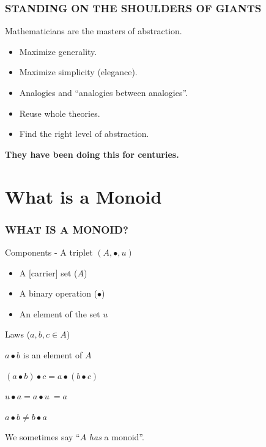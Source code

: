 \documentclass{beamer}
\begin{document}
\begin{frame} \frametitle{STANDING ON THE SHOULDERS OF GIANTS}
  Mathematicians are the \alert{masters of abstraction.}
  \begin{itemize}
  \item Maximize generality.
  \item Maximize simplicity (elegance).
  \item Analogies and ``analogies between analogies''.
  \item Reuse whole theories.
  \item Find the right level of abstraction.
  \end{itemize}

  \begin{block}{}
    \centering \Large
    \textbf{They have been doing this for centuries.}
  \end{block}
\end{frame}


\section{What is a Monoid}

\begin{frame} \frametitle{WHAT IS A MONOID?}
  \begin{block}{Components - A triplet \((A, \bullet, u)\)}
  \begin{itemize}
    \item A [carrier] \alert{set} (\(A\))
    \item A binary \alert{operation} (\(\bullet\))
    \item An \alert{element} of the set \(u\)
  \end{itemize}
  \end{block}

  \pause

  \begin{block}{Laws (\(a,b,c \in A\))}

  \begin{description}[Commutativity:]
    \item[Closure:] \(a \bullet b\) is an element of \(A\)
    \item[Associativity:] \((a \bullet b) \bullet c = a \bullet (b \bullet c)\)
    \item[Identity:] \(u \bullet a = a \bullet u \ = a\)
    \item[\sout{Commutativity:}] \(a \bullet b \neq b \bullet a\)
  \end{description}
  \end{block}
  We sometimes say ``\(A\) \emph{has} a monoid''.
\end{frame}
\end{document}
